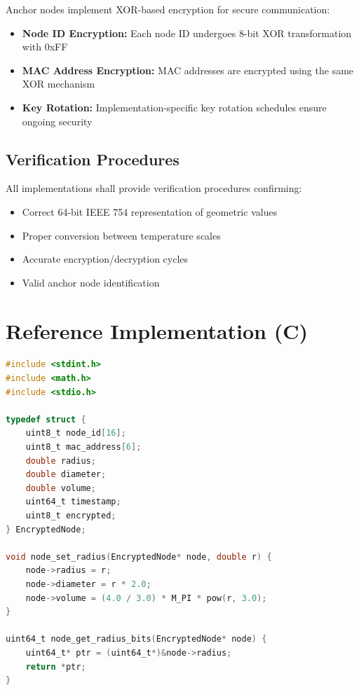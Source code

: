\documentclass[12pt]{book}
\begin{document}
Anchor nodes implement XOR-based encryption for secure communication:

\begin{itemize}
\item \textbf{Node ID Encryption:} Each node ID undergoes 8-bit XOR transformation with 0xFF
\item \textbf{MAC Address Encryption:} MAC addresses are encrypted using the same XOR mechanism
\item \textbf{Key Rotation:} Implementation-specific key rotation schedules ensure ongoing security
\end{itemize}

\section{Verification Procedures}

All implementations shall provide verification procedures confirming:

\begin{itemize}
\item Correct 64-bit IEEE 754 representation of geometric values
\item Proper conversion between temperature scales
\item Accurate encryption/decryption cycles
\item Valid anchor node identification
\end{itemize}

\appendix

\chapter{Reference Implementation (C)}

\begin{lstlisting}[language=C]
#include <stdint.h>
#include <math.h>
#include <stdio.h>

typedef struct {
    uint8_t node_id[16];
    uint8_t mac_address[6];
    double radius;
    double diameter;
    double volume;
    uint64_t timestamp;
    uint8_t encrypted;
} EncryptedNode;

void node_set_radius(EncryptedNode* node, double r) {
    node->radius = r;
    node->diameter = r * 2.0;
    node->volume = (4.0 / 3.0) * M_PI * pow(r, 3.0);
}

uint64_t node_get_radius_bits(EncryptedNode* node) {
    uint64_t* ptr = (uint64_t*)&node->radius;
    return *ptr;
}
\end{lstlisting}
\end{document}
